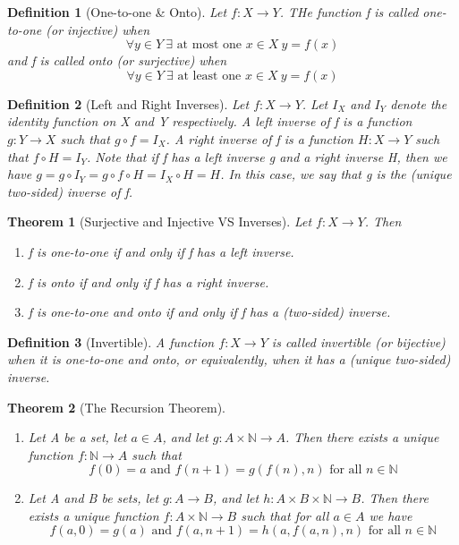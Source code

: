 \documentclass[11pt, oneside]{book}
\theoremstyle{break}
\newtheorem{thm}{Theorem}[section]
\newtheorem{defn}{Definition}[section]
\newcommand{\bb}[1]{\mathbb{#1}}		%
\begin{document}
\begin{defn}[One-to-one \& Onto]
	Let $f: X \to Y$. THe function f is called one-to-one (or injective) when
	\[
		\forall y \in Y \> \exists \text{ at most one } x \in X \> y = f(x)
	\]
	and f is called onto (or surjective) when
	\[
		\forall y \in Y \> \exists \text{ at least one } x \in X \> y = f(x)
	\]
\end{defn}

\begin{defn}[Left and Right Inverses]
	Let $f: X \to Y$. Let $I_X$ and $I_Y$ denote the identity function on X and Y respectively. A left inverse of f is a function $g: Y \to X$ such that $g \circ f = I_X$. A right inverse of f is a function $H: X \to Y$ such that $f \circ H = I_Y$. Note that if f has a left inverse g and a right inverse H, then we have $g = g \circ I_Y = g \circ f \circ H = I_X \circ H = H$. In this case, we say that g is the (unique two-sided) inverse of f.
\end{defn}

\begin{thm}[Surjective and Injective VS Inverses]
	Let $f: X \to Y$. Then
	\begin{enumerate}
		\item f is one-to-one if and only if f has a left inverse.
		\item f is onto if and only if f has a right inverse.
		\item f is one-to-one and onto if and only if f has a (two-sided) inverse.
	\end{enumerate}
\end{thm}

\begin{defn}[Invertible]
	A function $f: X \to Y$ is called invertible (or bijective) when it is one-to-one and onto, or equivalently, when it has a (unique two-sided) inverse.
\end{defn}

\begin{thm}[The Recursion Theorem]\label{recursion_theorem}
	\begin{enumerate}
		\item Let A be a set, let $a \in A$, and let $g : A \times \bb{N} \to A$. Then there exists a unique function $f: \bb{N} \to A$ such that
		\[
			f(0) = a \text{ and } f(n+1) = g(f(n), n) \text{ for all } n \in \bb{N}
		\]
		\item Let A and B be sets, let $g: A \to B$, and let $h: A \times B \times \bb{N} \to B$. Then there exists a unique function $f:A \times \bb{N} \to B$ such that for all $a \in A$ we have
		\[
			f(a, 0) = g(a) \text{ and } f(a, n + 1) = h(a, f(a, n), n) \text{ for all } n \in \bb{N}
		\]
	\end{enumerate}
\end{thm}
\end{document}
